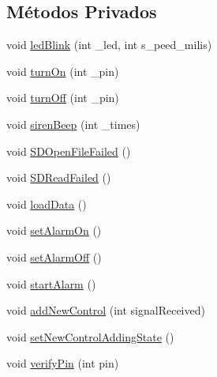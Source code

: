\subsection*{Métodos Privados}
\begin{DoxyCompactItemize}
\item 
void \hyperlink{classAlarmCentral_afdb07ab272d4a35af8d63fbfe01bf275}{led\+Blink} (int \+\_\+led, int s\+\_\+peed\+\_\+milis)
\item 
void \hyperlink{classAlarmCentral_ad40865ee4dbd43582ab96290ba3ffedf}{turn\+On} (int \+\_\+pin)
\item 
void \hyperlink{classAlarmCentral_ae3ce5787006fdf74904f4d13d4fd9ef1}{turn\+Off} (int \+\_\+pin)
\item 
void \hyperlink{classAlarmCentral_a9ad83822d0cab018346818d506c82e01}{siren\+Beep} (int \+\_\+times)
\item 
void \hyperlink{classAlarmCentral_aa036475859e8ff772b76456cd03a6edb}{S\+D\+Open\+File\+Failed} ()
\item 
void \hyperlink{classAlarmCentral_ada8da78dc55241536625a0585903906b}{S\+D\+Read\+Failed} ()
\item 
void \hyperlink{classAlarmCentral_a8e5c2c61c973d675cd8218a6f0f9c13c}{load\+Data} ()
\item 
void \hyperlink{classAlarmCentral_a084c1a6f0fcf525f142db938beb66754}{set\+Alarm\+On} ()
\item 
void \hyperlink{classAlarmCentral_a58fb4e4ff18e9ba38c604b30b21648ba}{set\+Alarm\+Off} ()
\item 
void \hyperlink{classAlarmCentral_ac6f4bc6e3bf8a1625a988fac07da56fc}{start\+Alarm} ()
\item 
void \hyperlink{classAlarmCentral_aa66eefb693fc8b45a7ecaac806344818}{add\+New\+Control} (int signal\+Received)
\item 
void \hyperlink{classAlarmCentral_ac6c9c892c47b5afd78d5f9d4e0f8b650}{set\+New\+Control\+Adding\+State} ()
\item 
void \hyperlink{classAlarmCentral_a1f48ab01d759a081252ee956e70f0806}{verify\+Pin} (int pin)
\end{DoxyCompactItemize}

